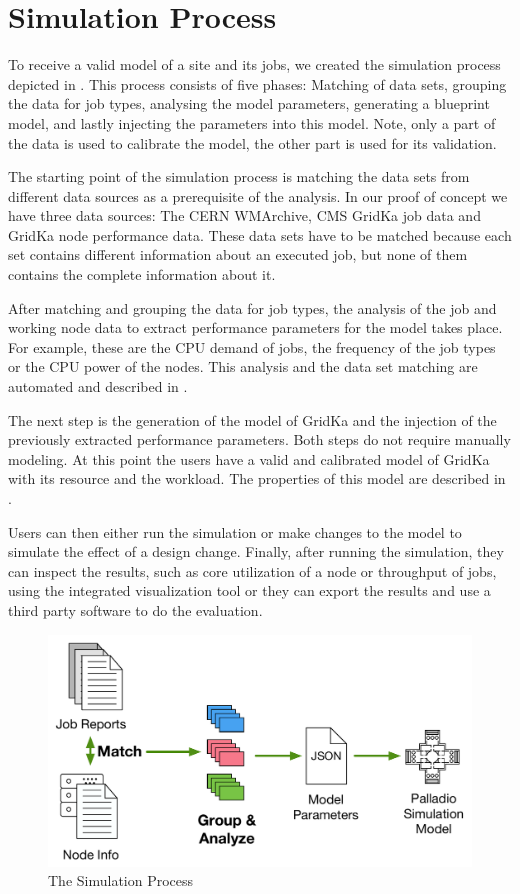 \documentclass{webofc}
\begin{document}
\section{Simulation Process}
\label{sec:process}
To receive a valid model of a site and its jobs, we created the simulation process depicted in . This process consists of five phases: Matching of data sets, grouping the data for job types, analysing the model parameters, generating a blueprint model, and lastly injecting the parameters into this model. Note, only a part of the data is used to calibrate the model, the other part is used for its validation.

The starting point of the simulation process is matching the data sets from different data sources as a prerequisite  of the analysis. In our proof of concept we have three data sources: The CERN WMArchive, CMS GridKa job data and GridKa node performance data. These data sets have to be matched because each set contains different information about an executed job, but none of them contains the complete information about it.

After matching and grouping the data for job types, the analysis of the job and working node data to extract performance parameters for the model takes place. For example, these are the CPU demand of jobs, the frequency of the job types or the CPU power of the nodes. This analysis and the data set matching are automated and described in .

The next step is the generation of the model of GridKa and the injection of the previously extracted performance parameters. Both steps do not require manually modeling. At this point the users have a valid and calibrated model of GridKa with its resource and the workload. The properties of this model are described in .

Users can then either run the simulation or make changes to the model to simulate the effect of a design change. 
Finally, after running the simulation, they can inspect the results, such as core utilization of a node or throughput of jobs, using the integrated visualization tool or they can export the results and use a third party software to do the evaluation.

\begin{figure}
	\centering
	\includegraphics[width=0.45\linewidth]{images/process}
	\caption[]{The Simulation Process}
	\label{process}
\end{figure}
\end{document}

